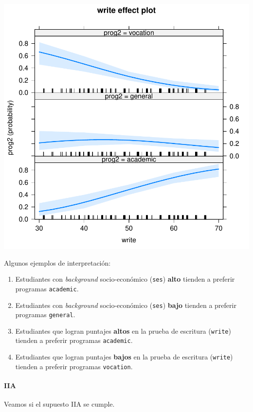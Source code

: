 \documentclass[onesided]{article}\usepackage[]{graphicx}\usepackage[]{color}
\makeatletter
\def\maxwidth{ %
  \ifdim\Gin@nat@width>\linewidth
    \linewidth
  \else
    \Gin@nat@width
  \fi
}
\makeatother
\begin{document}
{\centering \includegraphics[width=\maxwidth]{figure/pp-2} 

}




Algunos ejemplos de interpretaci\'on:

\begin{enumerate}
	\item Estudiantes con \emph{background} socio-econ\'omico (\texttt{ses}) {\bf alto} tienden a preferir programas \texttt{academic}.
	\item Estudiantes con \emph{background} socio-econ\'omico (\texttt{ses}) {\bf bajo} tienden a preferir programas \texttt{general}.
	\item Estudiantes que logran puntajes {\bf altos} en la prueba de escritura (\texttt{write}) tienden a preferir programas \texttt{academic}.
	\item Estudiantes que logran puntajes {\bf bajos} en la prueba de escritura (\texttt{write}) tienden a preferir programas \texttt{vocation}.
\end{enumerate}


\paragraph{IIA} Veamos si el supuesto IIA se cumple.
\end{document}
